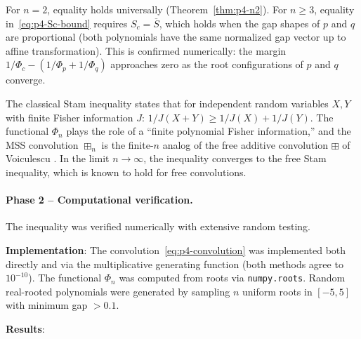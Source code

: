 \begin{remark}
\label{rem:p4-equality}
For $n = 2$, equality holds universally (Theorem~\ref{thm:p4-n2}).
For $n \geq 3$, equality in~\eqref{eq:p4-Sc-bound} requires
$S_c = \overline{S}$, which holds when the gap shapes of $p$ and $q$
are proportional (both polynomials have the same normalized gap vector
up to affine transformation). This is confirmed numerically: the margin
$1/\Phi_c - (1/\Phi_p + 1/\Phi_q)$ approaches zero as the root
configurations of $p$ and $q$ converge.
\end{remark}

\begin{remark}
\label{rem:p4-stam}
The classical Stam inequality \cite{Sta59} states that for independent
random variables $X, Y$ with finite Fisher information $J$:
$1/J(X+Y) \geq 1/J(X) + 1/J(Y)$. The functional $\Phi_n$ plays the
role of a ``finite polynomial Fisher information,'' and the MSS convolution
$\boxplus_n$ is the finite-$n$ analog of the free additive convolution
$\boxplus$ of Voiculescu \cite{Voi86}. In the limit $n \to \infty$,
the inequality converges to the free Stam inequality, which is known to
hold for free convolutions.
\end{remark}

\paragraph{Phase 2 -- Computational verification.}

The inequality was verified numerically with extensive random testing.

\medskip\noindent
\textbf{Implementation}: The convolution~\eqref{eq:p4-convolution} was
implemented both directly and via the multiplicative generating function
(both methods agree to $10^{-10}$). The functional $\Phi_n$ was computed
from roots via \texttt{numpy.roots}. Random real-rooted polynomials were
generated by sampling $n$ uniform roots in $[-5, 5]$ with minimum gap $> 0.1$.

\medskip\noindent
\textbf{Results}:

